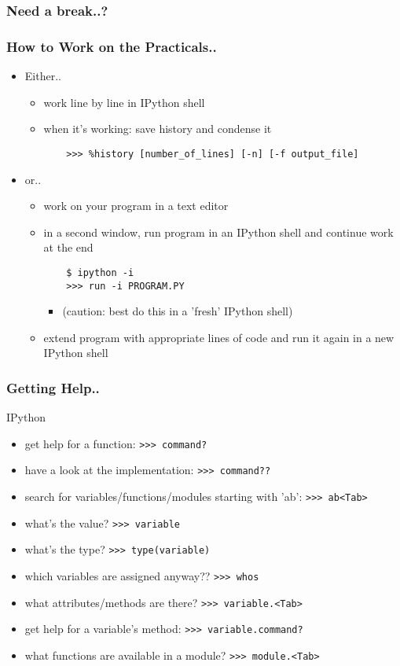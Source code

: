 \documentclass[t,10pt,compress=false,usepdftitle=false]{beamer}
\begin{document}
\begin{frame}[fragile]
    \frametitle{Need a break..?}
\end{frame}

\begin{frame}[fragile]
    \frametitle{How to Work on the Practicals..}
    \begin{itemize}
    \item Either..
        \begin{itemize}
        \item work line by line in IPython shell
        \item when it's working: save history and condense it
    \begin{verbatim}
    >>> %history [number_of_lines] [-n] [-f output_file]
    \end{verbatim}
        \end{itemize}
    \item or..
        \begin{itemize}
        \item work on your program in a text editor
        \item in a second window, run program in an IPython shell and continue work at the end
    \begin{verbatim}
    $ ipython -i
    >>> run -i PROGRAM.PY
    \end{verbatim}
            \begin{itemize}
            \item (caution: best do this in a 'fresh' IPython shell)
            \end{itemize}
        \item extend program with appropriate lines of code and run it again in a new IPython shell
        \end{itemize}
    \end{itemize}
\end{frame}

\begin{frame}[fragile]
    \frametitle{Getting Help..}
    IPython
    \begin{itemize}
    \item get help for a function: \verb#>>> command?#
    \item have a look at the implementation: \verb#>>> command??#
    \item search for variables/functions/modules starting with 'ab': \verb#>>> ab<Tab>#
    \item what's the value? \verb#>>> variable#
    \item what's the type? \verb#>>> type(variable)#
    \item which variables are assigned anyway?? \verb#>>> whos#
    \item what attributes/methods are there? \verb#>>> variable.<Tab>#
    \item get help for a variable's method: \verb#>>> variable.command?#
    \item what functions are available in a module? \verb#>>> module.<Tab>#
    \end{itemize}
\end{frame}
\end{document}
